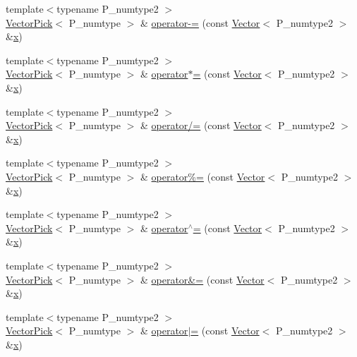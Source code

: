 \begin{DoxyCompactItemize}
\item 
{\footnotesize template$<$typename P\+\_\+numtype2 $>$ }\\\hyperlink{classVectorPick}{Vector\+Pick}$<$ P\+\_\+numtype $>$ \& \hyperlink{classVectorPick_a186ddd0523b6ab3b9738832a6f78f51d}{operator-\/=} (const \hyperlink{classVector}{Vector}$<$ P\+\_\+numtype2 $>$ \&\hyperlink{vecnorm1_8cc_ac73eed9e41ec09d58f112f06c2d6cb63}{x})
\item 
{\footnotesize template$<$typename P\+\_\+numtype2 $>$ }\\\hyperlink{classVectorPick}{Vector\+Pick}$<$ P\+\_\+numtype $>$ \& \hyperlink{classVectorPick_a7e53e03c29ada00b6f286a3e0c1a45a8}{operator$\ast$=} (const \hyperlink{classVector}{Vector}$<$ P\+\_\+numtype2 $>$ \&\hyperlink{vecnorm1_8cc_ac73eed9e41ec09d58f112f06c2d6cb63}{x})
\item 
{\footnotesize template$<$typename P\+\_\+numtype2 $>$ }\\\hyperlink{classVectorPick}{Vector\+Pick}$<$ P\+\_\+numtype $>$ \& \hyperlink{classVectorPick_aa87e2a8e34fe6d43e48fc3cb509d691c}{operator/=} (const \hyperlink{classVector}{Vector}$<$ P\+\_\+numtype2 $>$ \&\hyperlink{vecnorm1_8cc_ac73eed9e41ec09d58f112f06c2d6cb63}{x})
\item 
{\footnotesize template$<$typename P\+\_\+numtype2 $>$ }\\\hyperlink{classVectorPick}{Vector\+Pick}$<$ P\+\_\+numtype $>$ \& \hyperlink{classVectorPick_a7cf99007175f46772737db1a83b0c1bc}{operator\%=} (const \hyperlink{classVector}{Vector}$<$ P\+\_\+numtype2 $>$ \&\hyperlink{vecnorm1_8cc_ac73eed9e41ec09d58f112f06c2d6cb63}{x})
\item 
{\footnotesize template$<$typename P\+\_\+numtype2 $>$ }\\\hyperlink{classVectorPick}{Vector\+Pick}$<$ P\+\_\+numtype $>$ \& \hyperlink{classVectorPick_a00e4003d11828afcc89b567b48f83331}{operator$^\wedge$=} (const \hyperlink{classVector}{Vector}$<$ P\+\_\+numtype2 $>$ \&\hyperlink{vecnorm1_8cc_ac73eed9e41ec09d58f112f06c2d6cb63}{x})
\item 
{\footnotesize template$<$typename P\+\_\+numtype2 $>$ }\\\hyperlink{classVectorPick}{Vector\+Pick}$<$ P\+\_\+numtype $>$ \& \hyperlink{classVectorPick_a9e9df2839a12237c510eb4aeda49f071}{operator\&=} (const \hyperlink{classVector}{Vector}$<$ P\+\_\+numtype2 $>$ \&\hyperlink{vecnorm1_8cc_ac73eed9e41ec09d58f112f06c2d6cb63}{x})
\item 
{\footnotesize template$<$typename P\+\_\+numtype2 $>$ }\\\hyperlink{classVectorPick}{Vector\+Pick}$<$ P\+\_\+numtype $>$ \& \hyperlink{classVectorPick_a392be8926af362ec1767c58b3345d028}{operator$\vert$=} (const \hyperlink{classVector}{Vector}$<$ P\+\_\+numtype2 $>$ \&\hyperlink{vecnorm1_8cc_ac73eed9e41ec09d58f112f06c2d6cb63}{x})

\end{DoxyCompactItemize}
